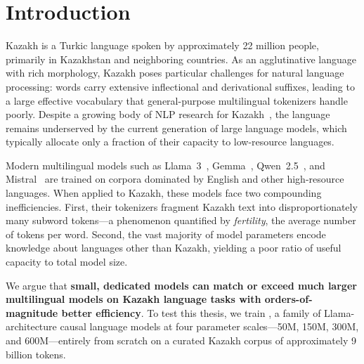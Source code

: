 \section{Introduction}

Kazakh is a Turkic language spoken by approximately 22 million people,
primarily in Kazakhstan and neighboring countries.  As an agglutinative
language with rich morphology, Kazakh poses particular challenges for
natural language processing: words carry extensive inflectional and
derivational suffixes, leading to a large effective vocabulary that
general-purpose multilingual tokenizers handle poorly.  Despite a
growing body of NLP research for Kazakh~\citep{yeshpanov2022kaznerd,
yeshpanov2024kazqad}, the language remains underserved by the current
generation of large language models, which typically allocate only a
fraction of their capacity to low-resource languages.

Modern multilingual models such as Llama~3~\citep{touvron2023llama},
Gemma~\citep{team2024gemma}, Qwen~2.5~\citep{bai2023qwen}, and
Mistral~\citep{jiang2023mistral} are trained on corpora dominated by
English and other high-resource languages.  When applied to Kazakh,
these models face two compounding inefficiencies.  First, their
tokenizers fragment Kazakh text into disproportionately many subword
tokens---a phenomenon quantified by \emph{fertility}, the average
number of tokens per word.  Second, the vast majority of model
parameters encode knowledge about languages other than Kazakh, yielding
a poor ratio of useful capacity to total model size.

We argue that \textbf{small, dedicated models can match or exceed much
larger multilingual models on Kazakh language tasks with
orders-of-magnitude better efficiency}.  To test this thesis, we train
\sozkz{}, a family of Llama-architecture causal language models at four
parameter scales---50M, 150M, 300M, and 600M---entirely from scratch on
a curated Kazakh corpus of approximately 9 billion tokens.

